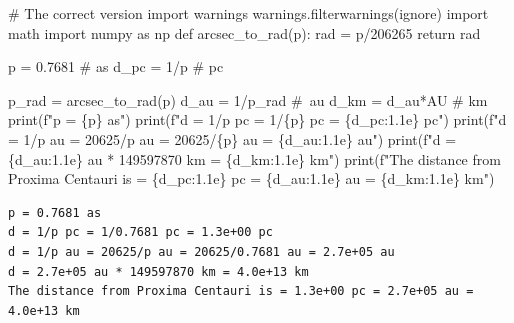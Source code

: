 \documentclass[
  letterpaper,
  DIV=11,
  numbers=noendperiod]{scrartcl}
\newenvironment{Shaded}{\begin{snugshade}}{\end{snugshade}}
\newcommand{\BuiltInTok}[1]{\textcolor[rgb]{0.00,0.23,0.31}{#1}}
\newcommand{\CommentTok}[1]{\textcolor[rgb]{0.37,0.37,0.37}{#1}}
\newcommand{\ControlFlowTok}[1]{\textcolor[rgb]{0.00,0.23,0.31}{#1}}
\newcommand{\DecValTok}[1]{\textcolor[rgb]{0.68,0.00,0.00}{#1}}
\newcommand{\FloatTok}[1]{\textcolor[rgb]{0.68,0.00,0.00}{#1}}
\newcommand{\ImportTok}[1]{\textcolor[rgb]{0.00,0.46,0.62}{#1}}
\newcommand{\KeywordTok}[1]{\textcolor[rgb]{0.00,0.23,0.31}{#1}}
\newcommand{\NormalTok}[1]{\textcolor[rgb]{0.00,0.23,0.31}{#1}}
\newcommand{\OperatorTok}[1]{\textcolor[rgb]{0.37,0.37,0.37}{#1}}
\newcommand{\SpecialCharTok}[1]{\textcolor[rgb]{0.37,0.37,0.37}{#1}}
\newcommand{\SpecialStringTok}[1]{\textcolor[rgb]{0.13,0.47,0.30}{#1}}
\newcommand{\StringTok}[1]{\textcolor[rgb]{0.13,0.47,0.30}{#1}}
\begin{document}
\begin{Shaded}
\begin{Highlighting}[]
\CommentTok{\# The correct version}
\ImportTok{import}\NormalTok{ warnings}
\NormalTok{warnings.filterwarnings(}\StringTok{\textquotesingle{}ignore\textquotesingle{}}\NormalTok{)}
\ImportTok{import}\NormalTok{ math}
\ImportTok{import}\NormalTok{ numpy }\ImportTok{as}\NormalTok{ np}
\KeywordTok{def}\NormalTok{ arcsec\_to\_rad(p):}
\NormalTok{    rad }\OperatorTok{=}\NormalTok{ p}\OperatorTok{/}\DecValTok{206265}
    \ControlFlowTok{return}\NormalTok{ rad}

\NormalTok{p }\OperatorTok{=} \FloatTok{0.7681} \CommentTok{\# as}
\NormalTok{d\_pc }\OperatorTok{=} \DecValTok{1}\OperatorTok{/}\NormalTok{p }\CommentTok{\# pc}

\NormalTok{p\_rad }\OperatorTok{=}\NormalTok{ arcsec\_to\_rad(p)}
\NormalTok{d\_au }\OperatorTok{=} \DecValTok{1}\OperatorTok{/}\NormalTok{p\_rad }\CommentTok{\# au}
\NormalTok{d\_km }\OperatorTok{=}\NormalTok{ d\_au}\OperatorTok{*}\NormalTok{AU }\CommentTok{\# km}
\BuiltInTok{print}\NormalTok{(}\SpecialStringTok{f"p = }\SpecialCharTok{\{}\NormalTok{p}\SpecialCharTok{\}}\SpecialStringTok{ as"}\NormalTok{)}
\BuiltInTok{print}\NormalTok{(}\SpecialStringTok{f"d = 1/p pc = 1/}\SpecialCharTok{\{}\NormalTok{p}\SpecialCharTok{\}}\SpecialStringTok{ pc = }\SpecialCharTok{\{}\NormalTok{d\_pc}\SpecialCharTok{:1.1e\}}\SpecialStringTok{ pc"}\NormalTok{)}
\BuiltInTok{print}\NormalTok{(}\SpecialStringTok{f"d = 1/p au = 20625/p au = 20625/}\SpecialCharTok{\{}\NormalTok{p}\SpecialCharTok{\}}\SpecialStringTok{ au = }\SpecialCharTok{\{}\NormalTok{d\_au}\SpecialCharTok{:1.1e\}}\SpecialStringTok{ au"}\NormalTok{)}
\BuiltInTok{print}\NormalTok{(}\SpecialStringTok{f"d = }\SpecialCharTok{\{}\NormalTok{d\_au}\SpecialCharTok{:1.1e\}}\SpecialStringTok{ au * 149597870 km = }\SpecialCharTok{\{}\NormalTok{d\_km}\SpecialCharTok{:1.1e\}}\SpecialStringTok{ km"}\NormalTok{)}
\BuiltInTok{print}\NormalTok{(}\SpecialStringTok{f"The distance from Proxima Centauri is = }\SpecialCharTok{\{}\NormalTok{d\_pc}\SpecialCharTok{:1.1e\}}\SpecialStringTok{ pc = }\SpecialCharTok{\{}\NormalTok{d\_au}\SpecialCharTok{:1.1e\}}\SpecialStringTok{ au = }\SpecialCharTok{\{}\NormalTok{d\_km}\SpecialCharTok{:1.1e\}}\SpecialStringTok{ km"}\NormalTok{)}
\end{Highlighting}
\end{Shaded}

\begin{verbatim}
p = 0.7681 as
d = 1/p pc = 1/0.7681 pc = 1.3e+00 pc
d = 1/p au = 20625/p au = 20625/0.7681 au = 2.7e+05 au
d = 2.7e+05 au * 149597870 km = 4.0e+13 km
The distance from Proxima Centauri is = 1.3e+00 pc = 2.7e+05 au = 4.0e+13 km
\end{verbatim}
\end{document}
